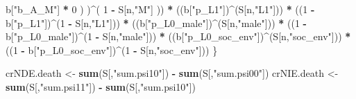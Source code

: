 \documentclass[
]{book}
\newenvironment{Shaded}{\begin{snugshade}}{\end{snugshade}}
\newcommand{\DecValTok}[1]{\textcolor[rgb]{0.00,0.00,0.81}{#1}}
\newcommand{\FunctionTok}[1]{\textcolor[rgb]{0.13,0.29,0.53}{\textbf{#1}}}
\newcommand{\NormalTok}[1]{#1}
\newcommand{\OtherTok}[1]{\textcolor[rgb]{0.56,0.35,0.01}{#1}}
\newcommand{\SpecialCharTok}[1]{\textcolor[rgb]{0.81,0.36,0.00}{\textbf{#1}}}
\newcommand{\StringTok}[1]{\textcolor[rgb]{0.31,0.60,0.02}{#1}}
\begin{document}
\begin{Shaded}
\begin{Highlighting}[]
\NormalTok{                b[}\StringTok{"b\_A\_M"}\NormalTok{] }\SpecialCharTok{*} \DecValTok{0}\NormalTok{ ) )}\SpecialCharTok{\^{}}\NormalTok{( }\DecValTok{1} \SpecialCharTok{{-}}\NormalTok{ S[n,}\StringTok{"M"}\NormalTok{] )) }\SpecialCharTok{*}
\NormalTok{      ((b[}\StringTok{"p\_L1"}\NormalTok{])}\SpecialCharTok{\^{}}\NormalTok{(S[n,}\StringTok{"L1"}\NormalTok{])) }\SpecialCharTok{*}
\NormalTok{      ((}\DecValTok{1} \SpecialCharTok{{-}}\NormalTok{ b[}\StringTok{"p\_L1"}\NormalTok{])}\SpecialCharTok{\^{}}\NormalTok{(}\DecValTok{1} \SpecialCharTok{{-}}\NormalTok{ S[n,}\StringTok{"L1"}\NormalTok{])) }\SpecialCharTok{*}
\NormalTok{      ((b[}\StringTok{"p\_L0\_male"}\NormalTok{])}\SpecialCharTok{\^{}}\NormalTok{(S[n,}\StringTok{"male"}\NormalTok{])) }\SpecialCharTok{*} 
\NormalTok{      ((}\DecValTok{1} \SpecialCharTok{{-}}\NormalTok{ b[}\StringTok{"p\_L0\_male"}\NormalTok{])}\SpecialCharTok{\^{}}\NormalTok{(}\DecValTok{1} \SpecialCharTok{{-}}\NormalTok{ S[n,}\StringTok{"male"}\NormalTok{])) }\SpecialCharTok{*} 
\NormalTok{      ((b[}\StringTok{"p\_L0\_soc\_env"}\NormalTok{])}\SpecialCharTok{\^{}}\NormalTok{(S[n,}\StringTok{"soc\_env"}\NormalTok{])) }\SpecialCharTok{*}
\NormalTok{      ((}\DecValTok{1} \SpecialCharTok{{-}}\NormalTok{ b[}\StringTok{"p\_L0\_soc\_env"}\NormalTok{])}\SpecialCharTok{\^{}}\NormalTok{(}\DecValTok{1} \SpecialCharTok{{-}}\NormalTok{ S[n,}\StringTok{"soc\_env"}\NormalTok{]))}
\NormalTok{    \}}
  
\NormalTok{  crNDE.death }\OtherTok{\textless{}{-}} \FunctionTok{sum}\NormalTok{(S[,}\StringTok{"sum.psi10"}\NormalTok{]) }\SpecialCharTok{{-}} \FunctionTok{sum}\NormalTok{(S[,}\StringTok{"sum.psi00"}\NormalTok{])}
\NormalTok{  crNIE.death }\OtherTok{\textless{}{-}} \FunctionTok{sum}\NormalTok{(S[,}\StringTok{"sum.psi11"}\NormalTok{]) }\SpecialCharTok{{-}} \FunctionTok{sum}\NormalTok{(S[,}\StringTok{"sum.psi10"}\NormalTok{])}
  

\end{Highlighting}
\end{Shaded}
\end{document}
